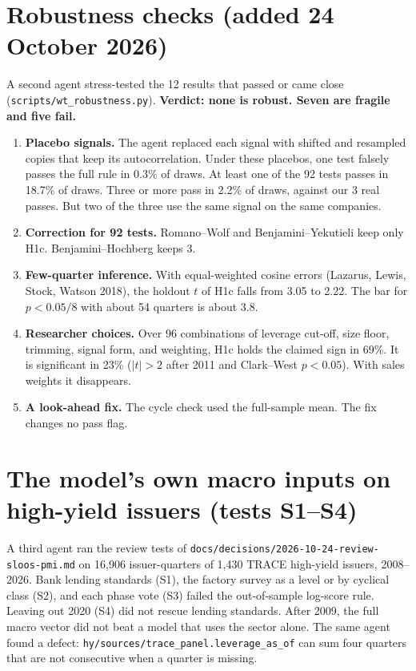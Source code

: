 \documentclass[11pt,a4paper]{article}
\newcommand{\code}[1]{\texttt{\small #1}}
\begin{document}
\section{Robustness checks (added 24 October 2026)}\label{sec:robust}
A second agent stress-tested the 12 results that passed or came close (\code{scripts/wt\_robustness.py}). \textbf{Verdict: none is robust. Seven are fragile and five fail.}
\begin{enumerate}
\item \textbf{Placebo signals.} The agent replaced each signal with shifted and resampled copies that keep its autocorrelation. Under these placebos, one test falsely passes the full rule in 0.3\% of draws. At least one of the 92 tests passes in 18.7\% of draws. Three or more pass in 2.2\% of draws, against our 3 real passes. But two of the three use the same signal on the same companies.
\item \textbf{Correction for 92 tests.} Romano--Wolf and Benjamini--Yekutieli keep only H1c. Benjamini--Hochberg keeps 3.
\item \textbf{Few-quarter inference.} With equal-weighted cosine errors (Lazarus, Lewis, Stock, Watson 2018), the holdout $t$ of H1c falls from 3.05 to 2.22. The bar for $p < 0.05/8$ with about 54 quarters is about 3.8.
\item \textbf{Researcher choices.} Over 96 combinations of leverage cut-off, size floor, trimming, signal form, and weighting, H1c holds the claimed sign in 69\%. It is significant in 23\% ($|t| > 2$ after 2011 and Clark--West $p < 0.05$). With sales weights it disappears.
\item \textbf{A look-ahead fix.} The cycle check used the full-sample mean. The fix changes no pass flag.
\end{enumerate}

\section{The model's own macro inputs on high-yield issuers (tests S1--S4)}
A third agent ran the review tests of \code{docs/decisions/2026-10-24-review-sloos-pmi.md} on 16,906 issuer-quarters of 1,430 TRACE high-yield issuers, 2008--2026. Bank lending standards (S1), the factory survey as a level or by cyclical class (S2), and each phase vote (S3) failed the out-of-sample log-score rule. Leaving out 2020 (S4) did not rescue lending standards. After 2009, the full macro vector did not beat a model that uses the sector alone. The same agent found a defect: \code{hy/sources/trace\_panel.leverage\_as\_of} can sum four quarters that are not consecutive when a quarter is missing.
\end{document}
